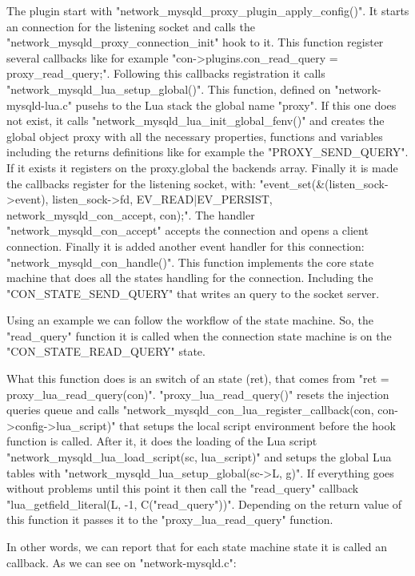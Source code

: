 The plugin start with "network\_mysqld\_proxy\_plugin\_apply\_config()". It starts an connection for the listening socket and calls the 
"network\_mysqld\_proxy\_connection\_init" hook to it. This function register several callbacks like for example "con->plugins.con\_read\_query = 
proxy\_read\_query;". Following this callbacks registration it calls "network\_mysqld\_lua\_setup\_global()". This function, defined on 
"network-mysqld-lua.c" pusehs to the Lua stack the global name "proxy". If this one does not exist, it calls "network\_mysqld\_lua\_init\_global\_fenv()" 
and creates the global object proxy with all the necessary properties, functions and variables including the returns definitions like for example the 
"PROXY\_SEND\_QUERY". If it exists it registers on the proxy.global the backends array. Finally it is made the callbacks register for the listening socket, 
with: "event\_set(\&(listen\_sock->event), listen\_sock->fd, EV\_READ|EV\_PERSIST, network\_mysqld\_con\_accept, con);". The handler 
"network\_mysqld\_con\_accept" accepts the connection and opens a client connection. Finally it is added another event handler for this connection: 
"network\_mysqld\_con\_handle()". This function implements the core state machine that does all the states handling for the connection. Including the 
"CON\_STATE\_SEND\_QUERY" that writes an query to the socket server.

Using an example we can follow the workflow of the state machine. So, the "read\_query" function it is called when the connection state machine is on the 
"CON\_STATE\_READ\_QUERY" state. 

What this function does is an switch of an state (ret), that comes from "ret = proxy\_lua\_read\_query(con)". "proxy\_lua\_read\_query()" resets the 
injection queries queue and calls "network\_mysqld\_con\_lua\_register\_callback(con, con->config->lua\_script)" that setups the local script environment 
before the hook function is called. After it, it does the loading of the Lua script "network\_mysqld\_lua\_load\_script(sc, lua\_script)" and setups the 
global Lua tables with "network\_mysqld\_lua\_setup\_global(sc->L, g)". If everything goes without problems until this point it then call the "read\_query" 
callback "lua\_getfield\_literal(L, -1, C("read\_query"))". Depending on the return value of this function it passes it to the "proxy\_lua\_read\_query" 
function.

In other words, we can report that for each state machine state it is called an callback. As we can see on "network-mysqld.c":\\ 

